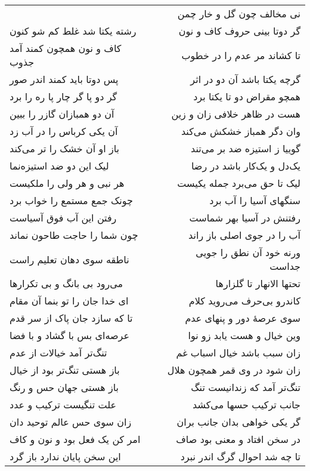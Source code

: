 \begin{center}
\begin{longtable}{l p{0.5cm} r}
&&
نی مخالف چون گل و خار چمن
\\
رشته یکتا شد غلط کم شو کنون
&&
گر دوتا بینی حروف کاف و نون
\\
کاف و نون همچون کمند آمد جذوب
&&
تا کشاند مر عدم را در خطوب
\\
پس دوتا باید کمند اندر صور
&&
گرچه یکتا باشد آن دو در اثر
\\
گر دو پا گر چار پا ره را برد
&&
همچو مقراض دو تا یکتا برد
\\
آن دو همبازان گازر را ببین
&&
هست در ظاهر خلافی زان و زین
\\
آن یکی کرباس را در آب زد
&&
وان دگر همباز خشکش می‌کند
\\
باز او آن خشک را تر می‌کند
&&
گوییا ز استیزه ضد بر می‌تند
\\
لیک این دو ضد استیزه‌نما
&&
یک‌دل و یک‌کار باشد در رضا
\\
هر نبی و هر ولی را ملکیست
&&
لیک تا حق می‌برد جمله یکیست
\\
چونک جمع مستمع را خواب برد
&&
سنگهای آسیا را آب برد
\\
رفتن این آب فوق آسیاست
&&
رفتنش در آسیا بهر شماست
\\
چون شما را حاجت طاحون نماند
&&
آب را در جوی اصلی باز راند
\\
ناطقه سوی دهان تعلیم راست
&&
ورنه خود آن نطق را جویی جداست
\\
می‌رود بی بانگ و بی تکرارها
&&
تحتها الانهار تا گلزارها
\\
ای خدا جان را تو بنما آن مقام
&&
کاندرو بی‌حرف می‌روید کلام
\\
تا که سازد جان پاک از سر قدم
&&
سوی عرصهٔ دور و پنهای عدم
\\
عرصه‌ای بس با گشاد و با فضا
&&
وین خیال و هست یابد زو نوا
\\
تنگ‌تر آمد خیالات از عدم
&&
زان سبب باشد خیال اسباب غم
\\
باز هستی تنگ‌تر بود از خیال
&&
زان شود در وی قمر همچون هلال
\\
باز هستی جهان حس و رنگ
&&
تنگ‌تر آمد که زندانیست تنگ
\\
علت تنگیست ترکیب و عدد
&&
جانب ترکیب حسها می‌کشد
\\
زان سوی حس عالم توحید دان
&&
گر یکی خواهی بدان جانب بران
\\
امر کن یک فعل بود و نون و کاف
&&
در سخن افتاد و معنی بود صاف
\\
این سخن پایان ندارد باز گرد
&&
تا چه شد احوال گرگ اندر نبرد
\\
\end{longtable}
\end{center}
